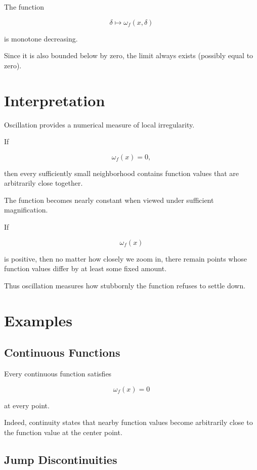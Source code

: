 \documentclass{essay}
\begin{document}
The function

\[ \delta \longmapsto \omega_{f}(x,\delta) \]

is monotone decreasing.

Since it is also bounded below by zero, the limit always exists (possibly equal
to zero).


\section{Interpretation}

Oscillation provides a numerical measure of local irregularity.

If

\[ \omega_{f}(x)=0, \]

then every sufficiently small neighborhood contains function values that are
arbitrarily close together.

The function becomes nearly constant when viewed under sufficient magnification.

If

\[ \omega_{f}(x) \]

is positive, then no matter how closely we zoom in, there remain points whose
function values differ by at least some fixed amount.

Thus oscillation measures how stubbornly the function refuses to settle down.


\section{Examples}

\subsection{Continuous Functions}

Every continuous function satisfies

\[ \omega_{f}(x)=0 \]

at every point.

Indeed, continuity states that nearby function values become arbitrarily close
to the function value at the center point.


\subsection{Jump Discontinuities}
\end{document}

